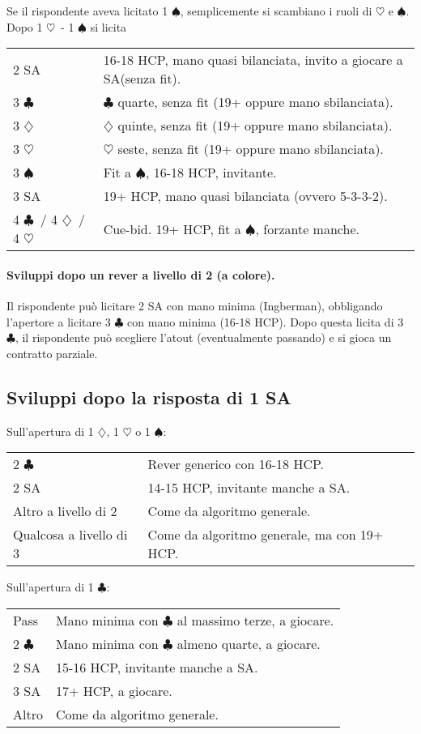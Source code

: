 \documentclass[a4paper,10pt]{article}
\renewcommand{\c}{$\clubsuit$\xspace}
\renewcommand{\d}{$\diamondsuit$\xspace}
\newcommand{\h}{$\heartsuit$\xspace}
\newcommand{\s}{$\spadesuit$\xspace}
\newcommand{\sa}{SA\xspace}
\newcommand{\smallspace}{\vskip0.3cm}
\newenvironment{twocol}
  {\smallspace\noindent\begin{tabular}{l p{0.78\textwidth}}}
  {\end{tabular}\smallspace}
\begin{document}
\noindent Se il rispondente aveva licitato 1 \s, semplicemente si scambiano i ruoli di \h e \s.
\smallspace
\noindent Dopo 1 \h\ - 1 \s si licita
\begin{twocol}
	2 \sa & 16-18 HCP, mano quasi bilanciata, invito a giocare a \sa (senza fit).\\
	3 \c & \c quarte, senza fit (19+ oppure mano sbilanciata).\\
	3 \d & \d quinte, senza fit (19+ oppure mano sbilanciata).\\
	3 \h & \h seste, senza fit (19+ oppure mano sbilanciata).\\
	3 \s & Fit a \s, 16-18 HCP, invitante.\\
	3 \sa & 19+ HCP, mano quasi bilanciata (ovvero 5-3-3-2).\\
	4 \c\ / 4 \d\ / 4 \h & Cue-bid. 19+ HCP, fit a \s, forzante manche.\\
\end{twocol}

\paragraph{Sviluppi dopo un rever a livello di 2 (a colore).} Il rispondente può licitare 2 \sa con mano minima (Ingberman), obbligando l'apertore a licitare 3 \c con mano minima (16-18 HCP). Dopo questa licita di 3 \c, il rispondente può scegliere l'atout (eventualmente passando) e si gioca un contratto parziale.



\subsection{Sviluppi dopo la risposta di 1 \sa}

Sull'apertura di 1 \d, 1 \h o 1 \s:
\begin{twocol}
	2 \c & Rever generico con 16-18 HCP.\\
	2 \sa & 14-15 HCP, invitante manche a \sa.\\
	Altro a livello di 2 & Come da algoritmo generale.\\
	Qualcosa a livello di 3 & Come da algoritmo generale, ma con 19+ HCP.
\end{twocol}

\noindent Sull'apertura di 1 \c:
\begin{twocol}
	Pass & Mano minima con \c al massimo terze, a giocare. \\
	2 \c & Mano minima con \c almeno quarte, a giocare. \\
	2 \sa & 15-16 HCP, invitante manche a \sa.\\
	3 \sa & 17+ HCP, a giocare.\\
	Altro & Come da algoritmo generale.
\end{twocol}
\end{document}
